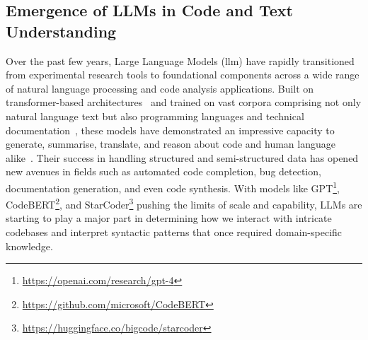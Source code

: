 \subsection{Emergence of LLMs in Code and Text Understanding}\label{subsec:LLMsInCodeText}
Over the past few years, Large Language Models (\gls{llm}) have rapidly transitioned from
experimental research tools to foundational components across a wide range of natural language
processing and code analysis applications. Built on transformer-based
architectures~\cite{vaswani2023attentionneed} and trained on vast corpora comprising not only
natural language text but also programming languages and technical
documentation~\cite{devlin2019bert}, these models have demonstrated an impressive capacity to
generate, summarise, translate, and reason about code and human language
alike~\cite{nourmohammadzadeh2024llmsurvey,metta2024generativeai,ferrag2024allinsights}. Their
success in handling structured and semi-structured data has opened new avenues in fields such as
automated code completion, bug detection, documentation generation, and even code synthesis. With
models like GPT\footnote{\url{https://openai.com/research/gpt-4}},
CodeBERT\footnote{\url{https://github.com/microsoft/CodeBERT}}, and
StarCoder\footnote{\url{https://huggingface.co/bigcode/starcoder}} pushing the limits of scale and
capability, LLMs are starting to play a major part in determining how we interact with intricate
codebases and interpret syntactic patterns that once required domain-specific knowledge.

